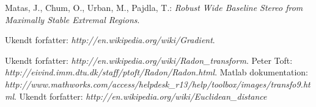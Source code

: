 \documentclass[11pt,a4paper,final]{article}
\begin{document}
\begin{thebibliography}{99}
 Matas, J., Chum, O., Urban, M., Pajdla, T.: \textit{Robust Wide Baseline Stereo from Maximally Stable Extremal Regions}.


 Ukendt forfatter: \textit{http://en.wikipedia.org/wiki/Gradient}.

 Ukendt forfatter: \textit{http://en.wikipedia.org/wiki/Radon\_transform}.
 Peter Toft: \textit{http://eivind.imm.dtu.dk/staff/ptoft/Radon/Radon.html}.
 Matlab dokumentation: \textit{http://www.mathworks.com/access/helpdesk\_r13/help/toolbox/images/transfo9.html}.
 Ukendt forfatter: \textit{http://en.wikipedia.org/wiki/Euclidean\_distance}


\end{thebibliography}

\appendix

\end{document}
